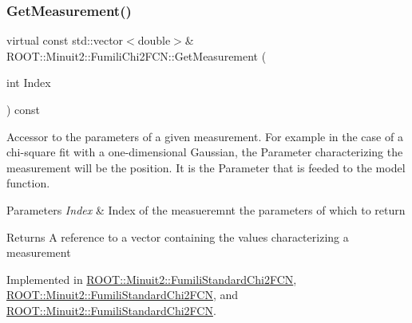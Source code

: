 \mbox{\label{classROOT_1_1Minuit2_1_1FumiliChi2FCN_a1831875c53596cd4aa52ea536de53b60}} 
\subsubsection{\texorpdfstring{GetMeasurement()}{GetMeasurement()}\hspace{0.1cm}{\footnotesize\ttfamily [1/3]}}
{\footnotesize\ttfamily virtual const std\+::vector$<$double$>$\& R\+O\+O\+T\+::\+Minuit2\+::\+Fumili\+Chi2\+F\+C\+N\+::\+Get\+Measurement (\begin{DoxyParamCaption}\item[{int}]{Index }\end{DoxyParamCaption}) const\hspace{0.3cm}{\ttfamily [pure virtual]}}

Accessor to the parameters of a given measurement. For example in the case of a chi-\/square fit with a one-\/dimensional Gaussian, the Parameter characterizing the measurement will be the position. It is the Parameter that is feeded to the model function.


\begin{DoxyParams}{Parameters}
{\em Index} & Index of the measueremnt the parameters of which to return \\
\hline
\end{DoxyParams}
\begin{DoxyReturn}{Returns}
A reference to a vector containing the values characterizing a measurement 
\end{DoxyReturn}


Implemented in \mbox{\hyperlink{classROOT_1_1Minuit2_1_1FumiliStandardChi2FCN_aed6181ee2996e090bc4aeb267771390e}{R\+O\+O\+T\+::\+Minuit2\+::\+Fumili\+Standard\+Chi2\+F\+CN}}, \mbox{\hyperlink{classROOT_1_1Minuit2_1_1FumiliStandardChi2FCN_a3bbc9a9cb77ce45aa764aa1f6e74349c}{R\+O\+O\+T\+::\+Minuit2\+::\+Fumili\+Standard\+Chi2\+F\+CN}}, and \mbox{\hyperlink{classROOT_1_1Minuit2_1_1FumiliStandardChi2FCN_a3bbc9a9cb77ce45aa764aa1f6e74349c}{R\+O\+O\+T\+::\+Minuit2\+::\+Fumili\+Standard\+Chi2\+F\+CN}}.

\mbox{\label{classROOT_1_1Minuit2_1_1FumiliChi2FCN_a1831875c53596cd4aa52ea536de53b60}} 
